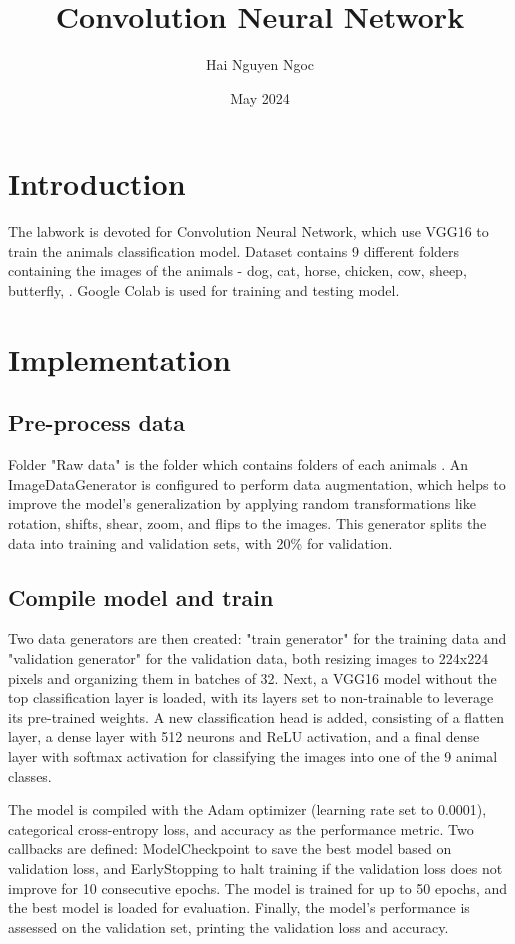 \documentclass{article}
\title{Convolution Neural Network}
\author{Hai Nguyen Ngoc}
\date{May 2024}
\begin{document}
\maketitle

\section{Introduction}
    The labwork is devoted for Convolution Neural Network, which use VGG16 to train the animals classification model. Dataset contains 9 different folders containing the images of the animals - dog, cat, horse, chicken, cow, sheep, butterfly,  . Google Colab is used for training and testing model.

\section{Implementation}

\subsection{Pre-process data}

Folder "Raw data" is the folder which contains folders of each animals . An ImageDataGenerator is configured to perform data augmentation, which helps to improve the model's generalization by applying random transformations like rotation, shifts, shear, zoom, and flips to the images. This generator splits the data into training and validation sets, with 20\%  for validation.

\subsection{Compile model and train}
Two data generators are then created: "train generator" for the training data and "validation generator" for the validation data, both resizing images to 224x224 pixels and organizing them in batches of 32. Next, a VGG16 model without the top classification layer is loaded, with its layers set to non-trainable to leverage its pre-trained weights. A new classification head is added, consisting of a flatten layer, a dense layer with 512 neurons and ReLU activation, and a final dense layer with softmax activation for classifying the images into one of the 9 animal classes.

The model is compiled with the Adam optimizer (learning rate set to 0.0001), categorical cross-entropy loss, and accuracy as the performance metric. Two callbacks are defined: ModelCheckpoint to save the best model based on validation loss, and EarlyStopping to halt training if the validation loss does not improve for 10 consecutive epochs. The model is trained for up to 50 epochs, and the best model is loaded for evaluation. Finally, the model's performance is assessed on the validation set, printing the validation loss and accuracy.
\end{document}
